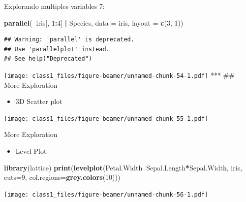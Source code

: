 \documentclass[ignorenonframetext,]{beamer}
\newenvironment{Shaded}{\begin{snugshade}}{\end{snugshade}}
\newcommand{\KeywordTok}[1]{\textcolor[rgb]{0.13,0.29,0.53}{\textbf{#1}}}
\newcommand{\DataTypeTok}[1]{\textcolor[rgb]{0.13,0.29,0.53}{#1}}
\newcommand{\DecValTok}[1]{\textcolor[rgb]{0.00,0.00,0.81}{#1}}
\newcommand{\StringTok}[1]{\textcolor[rgb]{0.31,0.60,0.02}{#1}}
\newcommand{\OperatorTok}[1]{\textcolor[rgb]{0.81,0.36,0.00}{\textbf{#1}}}
\newcommand{\NormalTok}[1]{#1}
\providecommand{\tightlist}{%
  \setlength{\itemsep}{0pt}\setlength{\parskip}{0pt}}
\begin{document}
\begin{frame}[fragile]{Explorando multiples variables 7:}

\begin{Shaded}
\begin{Highlighting}[]
\KeywordTok{parallel}\NormalTok{(}\OperatorTok{~}\NormalTok{iris[, }\DecValTok{1}\OperatorTok{:}\DecValTok{4}\NormalTok{] }\OperatorTok{|}\StringTok{ }\NormalTok{Species, }\DataTypeTok{data =}\NormalTok{ iris, }\DataTypeTok{layout =} \KeywordTok{c}\NormalTok{(}\DecValTok{3}\NormalTok{, }\DecValTok{1}\NormalTok{))}
\end{Highlighting}
\end{Shaded}

\begin{verbatim}
## Warning: 'parallel' is deprecated.
## Use 'parallelplot' instead.
## See help("Deprecated")
\end{verbatim}

\texttt{[image: class1\_files/figure-beamer/unnamed-chunk-54-1.pdf]} ***
\#\# More Exploration

\begin{itemize}
\tightlist
\item
  3D Scatter plot
\end{itemize}

\begin{Shaded}
\end{Shaded}

\texttt{[image: class1\_files/figure-beamer/unnamed-chunk-55-1.pdf]}

\end{frame}

\begin{frame}[fragile]{More Exploration}

\begin{itemize}
\tightlist
\item
  Level Plot
\end{itemize}

\begin{Shaded}
\begin{Highlighting}[]
\KeywordTok{library}\NormalTok{(lattice)}
\KeywordTok{print}\NormalTok{(}\KeywordTok{levelplot}\NormalTok{(Petal.Width}\OperatorTok{~}\NormalTok{Sepal.Length}\OperatorTok{*}\NormalTok{Sepal.Width, iris, }\DataTypeTok{cuts=}\DecValTok{9}\NormalTok{, }\DataTypeTok{col.regions=}\KeywordTok{grey.colors}\NormalTok{(}\DecValTok{10}\NormalTok{)))}
\end{Highlighting}
\end{Shaded}

\texttt{[image: class1\_files/figure-beamer/unnamed-chunk-56-1.pdf]}

\end{frame}
\end{document}
